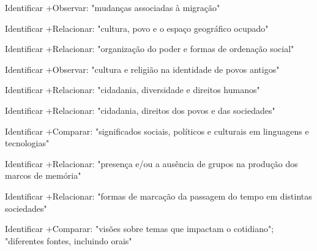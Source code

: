  Identificar +Observar: "mudanças associadas à migração"

 Identificar +Relacionar: "cultura, povo e o espaço geográfico ocupado"

 Identificar +Relacionar: "organização do poder e formas de ordenação social"

 Identificar +Observar: "cultura e religião na identidade de povos antigos"

 Identificar +Relacionar: "cidadania, diversidade e direitos humanos"

 Identificar +Relacionar: "cidadania, direitos dos povos e das sociedades"

 Identificar +Comparar: "significados sociais, políticos e culturais em linguagens e tecnologias"

 Identificar +Relacionar: "presença e/ou a ausência de grupos na produção dos marcos de memória"

 Identificar +Relacionar: "formas de marcação da passagem do tempo em distintas sociedades"

 Identificar +Comparar: "visões sobre temas que impactam o cotidiano"; "diferentes fontes, incluindo orais"


